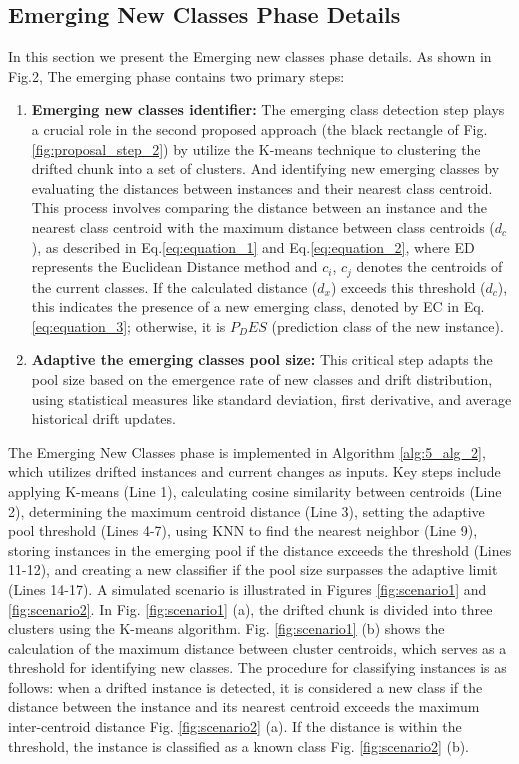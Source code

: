 \subsection{Emerging New Classes Phase Details}
\label{sec:emerging_phase}
In this section we present the Emerging new classes phase details. As shown in Fig.2, The emerging phase contains two primary steps:
\begin{enumerate}
	\item \textbf{Emerging new classes identifier:} The emerging class detection step plays a crucial role in the second proposed approach (the black rectangle of Fig. \ref{fig:proposal_step_2}) by utilize the K-means technique to clustering the drifted chunk into a set of clusters. And identifying new emerging classes by evaluating the distances between instances and their nearest class centroid. This process involves comparing the distance between an instance and the nearest class centroid with the maximum distance between class centroids ($d_c$), as described in Eq.\ref{eq:equation_1} and Eq.\ref{eq:equation_2}, where ED represents the Euclidean Distance method and $c_i$, $c_j$ denotes the centroids of the current classes. If the calculated distance ($d_x$) exceeds this threshold ($d_c$), this indicates the presence of a new emerging class, denoted by EC in Eq. \ref{eq:equation_3}; otherwise, it is $P_DES$ (prediction class of the new instance).
	\item \textbf{Adaptive the emerging classes pool size:} This critical step adapts the pool size based on the emergence rate of new classes and drift distribution, using statistical measures like standard deviation, first derivative, and average historical drift updates.
\end{enumerate}
The Emerging New Classes phase is implemented in Algorithm \ref{alg:5_alg_2}, which utilizes drifted instances and current changes as inputs. Key steps include applying K-means (Line 1), calculating cosine similarity between centroids (Line 2), determining the maximum centroid distance (Line 3), setting the adaptive pool threshold (Lines 4-7), using KNN to find the nearest neighbor (Line 9), storing instances in the emerging pool if the distance exceeds the threshold (Lines 11-12), and creating a new classifier if the pool size surpasses the adaptive limit (Lines 14-17). A simulated scenario is illustrated in Figures  \ref{fig:scenario1} and  \ref{fig:scenario2}. In Fig. \ref{fig:scenario1} (a), the drifted chunk is divided into three clusters using the K-means algorithm. Fig. \ref{fig:scenario1} (b) shows the calculation of the maximum distance between cluster centroids, which serves as a threshold for identifying new classes. The procedure for classifying instances is as follows: when a drifted instance is detected, it is considered a new class if the distance between the instance and its nearest centroid exceeds the maximum inter-centroid distance Fig. \ref{fig:scenario2} (a). If the distance is within the threshold, the instance is classified as a known class Fig. \ref{fig:scenario2} (b).


